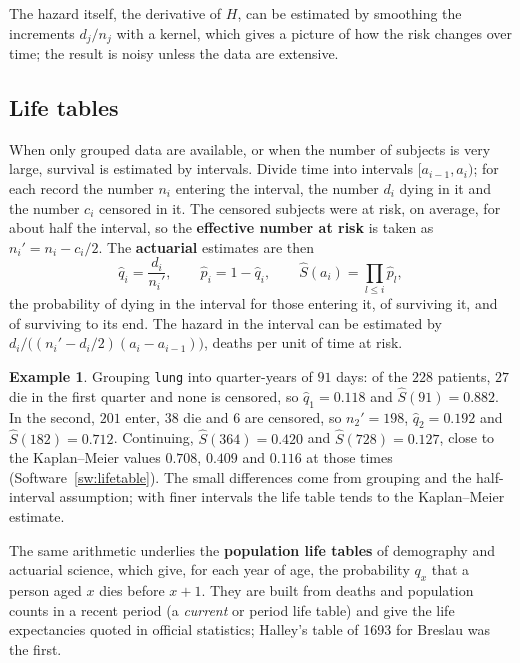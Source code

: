 \documentclass[11pt,a4paper]{article}
\numberwithin{equation}{section}
\theoremstyle{definition}
\newtheorem{exa}[thm]{Example}
\begin{document}
The hazard itself, the derivative of $H$, can be estimated by smoothing the increments $d_j/n_j$ with a kernel, which gives a picture of how the risk changes over time; the result is noisy unless the data are extensive.

\subsection{Life tables}
\label{ssec:lifetables}

When only grouped data are available, or when the number of subjects is very large, survival is estimated by intervals. Divide time into intervals $[a_{i - 1}, a_i)$; for each record the number $n_i$ entering the interval, the number $d_i$ dying in it and the number $c_i$ censored in it. The censored subjects were at risk, on average, for about half the
interval, so the \textbf{effective number at risk} is taken as $n_i' = n_i - c_i/2$. The \textbf{actuarial} estimates are then
\[
\hat q_i = \frac{d_i}{n_i'}, \qquad \hat p_i = 1 - \hat q_i, \qquad \hat S(a_i) = \prod_{l \leq i}\hat p_l ,
\]
the probability of dying in the interval for those entering it, of surviving it, and of surviving to its end. The hazard in the interval can be estimated by $d_i/\bigl((n_i' - d_i/2)(a_i - a_{i - 1})\bigr)$, deaths per unit of time at risk.

\begin{exa}
\label{ex:lifetable}
Grouping \texttt{lung} into quarter-years of $91$ days: of the $228$ patients, $27$ die in the first quarter and none is censored, so $\hat q_1 = 0.118$ and $\hat S(91) = 0.882$. In the second, $201$ enter, $38$ die and $6$ are censored, so $n_2' = 198$, $\hat q_2 = 0.192$ and $\hat S(182) = 0.712$. Continuing, $\hat S(364) = 0.420$ and
$\hat S(728) = 0.127$, close to the Kaplan--Meier values $0.708$, $0.409$ and $0.116$ at those times (Software~\ref{sw:lifetable}). The small differences come from grouping and the half-interval assumption; with finer intervals the life table tends to the Kaplan--Meier estimate.
\end{exa}

The same arithmetic underlies the \textbf{population life tables} of demography and actuarial science, which give, for each year of age, the probability $q_x$ that a person aged $x$ dies before $x + 1$. They are built from deaths and population counts in a recent period (a \emph{current} or period life table) and give the life expectancies quoted
in official statistics; Halley's table of 1693 for Breslau was the first.
\end{document}
